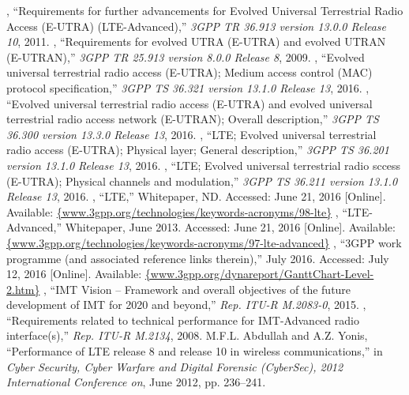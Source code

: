 %

\begin{thebibliography}{99.}%
	, ``{Requirements for further advancements for Evolved Universal Terrestrial Radio Access (E-UTRA) (LTE-Advanced)},'' \emph{{3GPP TR 36.913 version 13.0.0 Release 10}}, 2011.
	, ``{Requirements for evolved UTRA (E-UTRA) and evolved UTRAN (E-UTRAN)},'' \emph{{3GPP TR 25.913 version 8.0.0 Release 8}}, 2009.
	, ``{Evolved universal terrestrial radio access (E-UTRA); Medium access control (MAC) protocol specification},'' \emph{{3GPP TS 36.321 version 13.1.0 Release 13}}, 2016.
	, ``{Evolved universal terrestrial radio access (E-UTRA) and evolved universal terrestrial radio access network (E-UTRAN); Overall description},'' \emph{{3GPP TS 36.300 version 13.3.0 Release 13}}, 2016.
	, ``LTE; Evolved universal terrestrial radio access (E-UTRA); Physical layer; General description,'' \emph{{3GPP TS 36.201 version 13.1.0 Release 13}}, 2016.
	, ``LTE; Evolved universal terrestrial radio sccess (E-UTRA); Physical channels and modulation,'' \emph{{3GPP TS 36.211 version 13.1.0 Release 13}}, 2016.
	, ``{LTE},'' Whitepaper, ND. Accessed: June 21, 2016 [Online]. Available: \url{{www.3gpp.org/technologies/keywords-acronyms/98-lte}}
	, ``{LTE-Advanced},'' Whitepaper, June 2013. Accessed: June 21, 2016 [Online]. Available: \url{{www.3gpp.org/technologies/keywords-acronyms/97-lte-advanced}}
	, ``{3GPP work programme (and associated reference links therein)},'' July 2016. Accessed: July 12, 2016 [Online]. Available: \url{{www.3gpp.org/dynareport/GanttChart-Level-2.htm}}		
	, ``IMT Vision –	Framework and overall objectives of the future development of IMT for 2020 and beyond,'' \emph{Rep. ITU-R M.2083-0}, 2015. 
	, ``Requirements related to technical performance for IMT-Advanced radio interface(s),'' \emph{Rep. ITU-R M.2134}, 2008. 
	 {M.F.L. Abdullah and A.Z. Yonis}, ``{Performance of LTE release 8 and release 10 in wireless communications},'' in \emph{{Cyber Security, Cyber Warfare and Digital Forensic (CyberSec), 2012 International Conference on}}, June 2012, pp. 236--241.
		
\end{thebibliography}
